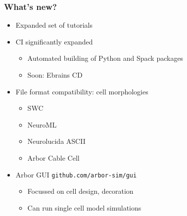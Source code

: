 \documentclass[t]{beamer}
\begin{document}
\begin{frame}
    \frametitle{What's new?}
    \begin{itemize}
    \item Expanded set of tutorials
    \item CI significantly expanded
    \begin{itemize}
    \item Automated building of Python and Spack packages
    \item Soon: Ebrains CD
    \end{itemize}
    \item File format compatibility: cell morphologies
    \begin{itemize}
    \item SWC
    \item NeuroML
    \item Neurolucida ASCII
    \item Arbor Cable Cell
    \end{itemize}
    \item Arbor GUI \texttt{github.com/arbor-sim/gui}
    \begin{itemize}
    \item Focussed on cell design, decoration
    \item Can run single cell model simulations
    \end{itemize}
    \end{itemize}
\end{frame}
\end{document}
